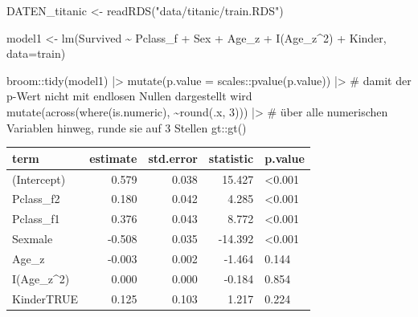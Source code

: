\documentclass[
  10pt,
  letterpaper,
  a4paper, twoside]{scrreprt}
\newenvironment{Shaded}{\begin{snugshade}}{\end{snugshade}}
\newcommand{\AttributeTok}[1]{\textcolor[rgb]{0.40,0.45,0.13}{#1}}
\newcommand{\CommentTok}[1]{\textcolor[rgb]{0.37,0.37,0.37}{#1}}
\newcommand{\DecValTok}[1]{\textcolor[rgb]{0.68,0.00,0.00}{#1}}
\newcommand{\FunctionTok}[1]{\textcolor[rgb]{0.28,0.35,0.67}{#1}}
\newcommand{\NormalTok}[1]{\textcolor[rgb]{0.00,0.23,0.31}{#1}}
\newcommand{\OtherTok}[1]{\textcolor[rgb]{0.00,0.23,0.31}{#1}}
\newcommand{\SpecialCharTok}[1]{\textcolor[rgb]{0.37,0.37,0.37}{#1}}
\newcommand{\StringTok}[1]{\textcolor[rgb]{0.13,0.47,0.30}{#1}}
\begin{document}
\begin{Shaded}
\begin{Highlighting}[]
\NormalTok{DATEN\_titanic }\OtherTok{\textless{}{-}} \FunctionTok{readRDS}\NormalTok{(}\StringTok{"data/titanic/train.RDS"}\NormalTok{)}

\NormalTok{model1 }\OtherTok{\textless{}{-}} \FunctionTok{lm}\NormalTok{(Survived }\SpecialCharTok{\textasciitilde{}}\NormalTok{ Pclass\_f }\SpecialCharTok{+}\NormalTok{ Sex }\SpecialCharTok{+}\NormalTok{ Age\_z }\SpecialCharTok{+} \FunctionTok{I}\NormalTok{(Age\_z}\SpecialCharTok{\^{}}\DecValTok{2}\NormalTok{) }\SpecialCharTok{+}\NormalTok{ Kinder, }\AttributeTok{data=}\NormalTok{train)}

\NormalTok{broom}\SpecialCharTok{::}\FunctionTok{tidy}\NormalTok{(model1) }\SpecialCharTok{|\textgreater{}}
 \FunctionTok{mutate}\NormalTok{(}\AttributeTok{p.value =}\NormalTok{ scales}\SpecialCharTok{::}\FunctionTok{pvalue}\NormalTok{(p.value)) }\SpecialCharTok{|\textgreater{}} \CommentTok{\# damit der p{-}Wert nicht mit endlosen Nullen dargestellt wird}
 \FunctionTok{mutate}\NormalTok{(}\FunctionTok{across}\NormalTok{(}\FunctionTok{where}\NormalTok{(is.numeric), }\SpecialCharTok{\textasciitilde{}}\FunctionTok{round}\NormalTok{(.x, }\DecValTok{3}\NormalTok{))) }\SpecialCharTok{|\textgreater{}} \CommentTok{\# über alle numerischen Variablen hinweg, runde sie auf 3 Stellen}
\NormalTok{ gt}\SpecialCharTok{::}\FunctionTok{gt}\NormalTok{()}
\end{Highlighting}
\end{Shaded}

\begin{longtable*}{lrrrl}
\toprule
term & estimate & std.error & statistic & p.value \\ 
\midrule\addlinespace[2.5pt]
(Intercept) & 0.579 & 0.038 & 15.427 & <0.001 \\ 
Pclass\_f2 & 0.180 & 0.042 & 4.285 & <0.001 \\ 
Pclass\_f1 & 0.376 & 0.043 & 8.772 & <0.001 \\ 
Sexmale & -0.508 & 0.035 & -14.392 & <0.001 \\ 
Age\_z & -0.003 & 0.002 & -1.464 & 0.144 \\ 
I(Age\_z\textasciicircum{}2) & 0.000 & 0.000 & -0.184 & 0.854 \\ 
KinderTRUE & 0.125 & 0.103 & 1.217 & 0.224 \\ 
\bottomrule
\end{longtable*}
\end{document}
